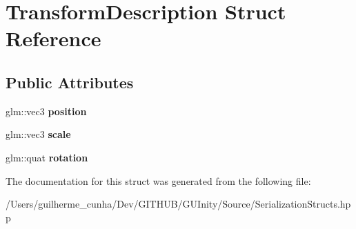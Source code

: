 \hypertarget{struct_transform_description}{}\section{Transform\+Description Struct Reference}
\label{struct_transform_description}
\subsection*{Public Attributes}
\begin{DoxyCompactItemize}
\item 
\hypertarget{struct_transform_description_af30c11b9ea9d3625e64e7643933a4764}{}glm\+::vec3 {\bfseries position}\label{struct_transform_description_af30c11b9ea9d3625e64e7643933a4764}

\item 
\hypertarget{struct_transform_description_aadc5cf435db428e9c13774472fb7ff57}{}glm\+::vec3 {\bfseries scale}\label{struct_transform_description_aadc5cf435db428e9c13774472fb7ff57}

\item 
\hypertarget{struct_transform_description_acb2be77a95ee5659961c0e78ad1c095a}{}glm\+::quat {\bfseries rotation}\label{struct_transform_description_acb2be77a95ee5659961c0e78ad1c095a}

\end{DoxyCompactItemize}


The documentation for this struct was generated from the following file\+:\begin{DoxyCompactItemize}
\item 
/\+Users/guilherme\+\_\+cunha/\+Dev/\+G\+I\+T\+H\+U\+B/\+G\+U\+Inity/\+Source/Serialization\+Structs.\+hpp\end{DoxyCompactItemize}
